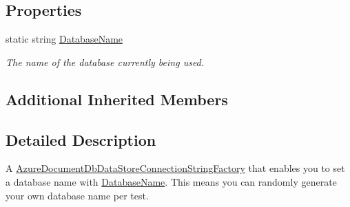 \subsection*{Properties}
\begin{DoxyCompactItemize}
\item 
static string \hyperlink{classCqrs_1_1Ninject_1_1Azure_1_1DocumentDb_1_1Factories_1_1TestAzureDocumentDbDataStoreConnectionStringFactory_ae0da37bd91333ad782058d32d4de2594_ae0da37bd91333ad782058d32d4de2594}{Database\+Name}
\begin{DoxyCompactList}\small\item\em The name of the database currently being used. \end{DoxyCompactList}\end{DoxyCompactItemize}
\subsection*{Additional Inherited Members}


\subsection{Detailed Description}
A \hyperlink{classCqrs_1_1Azure_1_1DocumentDb_1_1Factories_1_1AzureDocumentDbDataStoreConnectionStringFactory_a9b08d89df792a20e71f5278dbf39b804_a9b08d89df792a20e71f5278dbf39b804}{Azure\+Document\+Db\+Data\+Store\+Connection\+String\+Factory} that enables you to set a database name with \hyperlink{classCqrs_1_1Ninject_1_1Azure_1_1DocumentDb_1_1Factories_1_1TestAzureDocumentDbDataStoreConnectionStringFactory_ae0da37bd91333ad782058d32d4de2594_ae0da37bd91333ad782058d32d4de2594}{Database\+Name}. This means you can randomly generate your own database name per test. 



